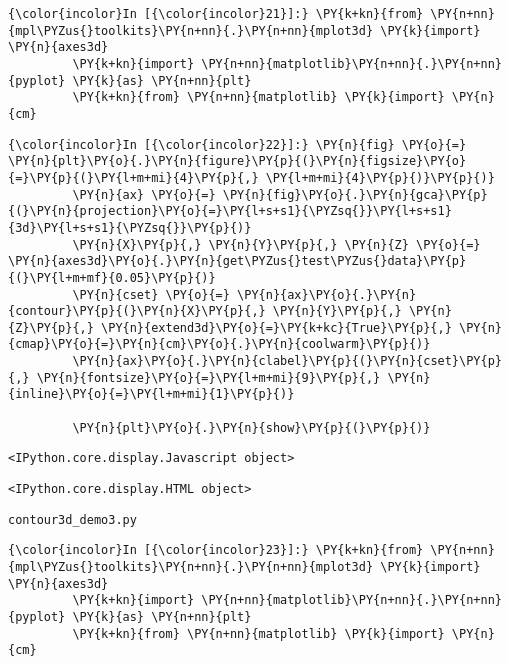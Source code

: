     \begin{Verbatim}[commandchars=\\\{\}]
{\color{incolor}In [{\color{incolor}21}]:} \PY{k+kn}{from} \PY{n+nn}{mpl\PYZus{}toolkits}\PY{n+nn}{.}\PY{n+nn}{mplot3d} \PY{k}{import} \PY{n}{axes3d}
         \PY{k+kn}{import} \PY{n+nn}{matplotlib}\PY{n+nn}{.}\PY{n+nn}{pyplot} \PY{k}{as} \PY{n+nn}{plt}
         \PY{k+kn}{from} \PY{n+nn}{matplotlib} \PY{k}{import} \PY{n}{cm}
\end{Verbatim}


    \begin{Verbatim}[commandchars=\\\{\}]
{\color{incolor}In [{\color{incolor}22}]:} \PY{n}{fig} \PY{o}{=} \PY{n}{plt}\PY{o}{.}\PY{n}{figure}\PY{p}{(}\PY{n}{figsize}\PY{o}{=}\PY{p}{(}\PY{l+m+mi}{4}\PY{p}{,} \PY{l+m+mi}{4}\PY{p}{)}\PY{p}{)}
         \PY{n}{ax} \PY{o}{=} \PY{n}{fig}\PY{o}{.}\PY{n}{gca}\PY{p}{(}\PY{n}{projection}\PY{o}{=}\PY{l+s+s1}{\PYZsq{}}\PY{l+s+s1}{3d}\PY{l+s+s1}{\PYZsq{}}\PY{p}{)}
         \PY{n}{X}\PY{p}{,} \PY{n}{Y}\PY{p}{,} \PY{n}{Z} \PY{o}{=} \PY{n}{axes3d}\PY{o}{.}\PY{n}{get\PYZus{}test\PYZus{}data}\PY{p}{(}\PY{l+m+mf}{0.05}\PY{p}{)}
         \PY{n}{cset} \PY{o}{=} \PY{n}{ax}\PY{o}{.}\PY{n}{contour}\PY{p}{(}\PY{n}{X}\PY{p}{,} \PY{n}{Y}\PY{p}{,} \PY{n}{Z}\PY{p}{,} \PY{n}{extend3d}\PY{o}{=}\PY{k+kc}{True}\PY{p}{,} \PY{n}{cmap}\PY{o}{=}\PY{n}{cm}\PY{o}{.}\PY{n}{coolwarm}\PY{p}{)}
         \PY{n}{ax}\PY{o}{.}\PY{n}{clabel}\PY{p}{(}\PY{n}{cset}\PY{p}{,} \PY{n}{fontsize}\PY{o}{=}\PY{l+m+mi}{9}\PY{p}{,} \PY{n}{inline}\PY{o}{=}\PY{l+m+mi}{1}\PY{p}{)}
         
         \PY{n}{plt}\PY{o}{.}\PY{n}{show}\PY{p}{(}\PY{p}{)}
\end{Verbatim}


    
    \begin{verbatim}
<IPython.core.display.Javascript object>
    \end{verbatim}

    
    
    \begin{verbatim}
<IPython.core.display.HTML object>
    \end{verbatim}

    
    \texttt{contour3d\_demo3.py}

    \begin{Verbatim}[commandchars=\\\{\}]
{\color{incolor}In [{\color{incolor}23}]:} \PY{k+kn}{from} \PY{n+nn}{mpl\PYZus{}toolkits}\PY{n+nn}{.}\PY{n+nn}{mplot3d} \PY{k}{import} \PY{n}{axes3d}
         \PY{k+kn}{import} \PY{n+nn}{matplotlib}\PY{n+nn}{.}\PY{n+nn}{pyplot} \PY{k}{as} \PY{n+nn}{plt}
         \PY{k+kn}{from} \PY{n+nn}{matplotlib} \PY{k}{import} \PY{n}{cm}
\end{Verbatim}


